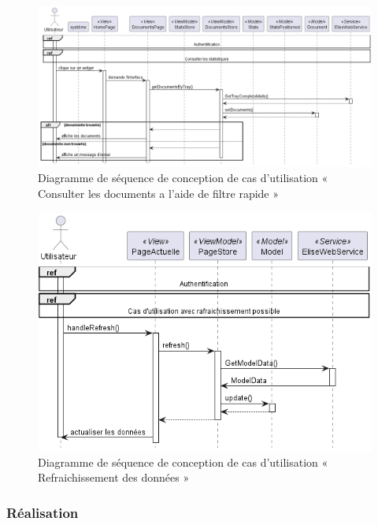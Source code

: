 \begin{figure}[H]
  \centering
  \includegraphics[width=1\textwidth]{out/diagrams/sprint7/sequence_docs_quick_filter/sequence_docs_quick_filter}
  \caption{Diagramme de séquence de conception de cas d'utilisation « Consulter les documents a l'aide de filtre rapide »}
  \label{fig:sequence_conception_consulter_documents_filtre_rapide}
\end{figure}

\begin{figure}[H]
  \centering
  \includegraphics[width=1\textwidth]{out/diagrams/sprint7/sequence_refresh_data/sequence_refresh_data}
  \caption{Diagramme de séquence de conception de cas d'utilisation « Refraichissement des données »}
  \label{fig:sequence_conception_refraichissement_donnees}
\end{figure}

\subsubsection{Réalisation}

